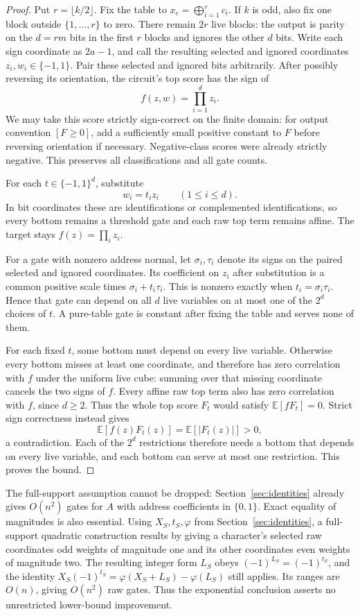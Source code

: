 \documentclass[11pt]{article}
\begin{document}
\begin{proof}
Put $r=\lfloor k/2\rfloor$. Fix the table to
$x_c=\bigoplus_{i=1}^r c_i$. If $k$ is odd, also fix one block outside
$\{1,\ldots,r\}$ to zero. There remain $2r$ live blocks: the output is
parity on the $d=rm$ bits in the first $r$ blocks and ignores the other
$d$ bits. Write each sign coordinate as $2a-1$, and call the resulting selected
and ignored coordinates $z_i,w_i\in\{-1,1\}$. Pair these selected
and ignored bits arbitrarily. After possibly reversing its orientation,
the circuit's top score has the sign of
$$
f(z,w)=\prod_{i=1}^d z_i.
$$
We may take this score strictly sign-correct on the finite domain: for
output convention $[F\ge0]$, add a sufficiently small positive constant
to $F$ before reversing orientation if necessary. Negative-class scores
were already strictly negative. This preserves all classifications and
all gate counts.

For each $t\in\{-1,1\}^d$, substitute
$$
w_i=t_i z_i\qquad(1\le i\le d).
$$
In bit coordinates these are identifications or complemented
identifications, so every bottom remains a threshold gate and each raw
top term remains affine. The target stays $f(z)=\prod_i z_i$.

For a gate with nonzero address normal, let $\sigma_i,\tau_i$ denote its
signs on the paired selected and ignored coordinates. Its coefficient
on $z_i$ after substitution is a common positive scale times
$\sigma_i+t_i\tau_i$. This is nonzero exactly when
$t_i=\sigma_i\tau_i$. Hence that gate can depend on all $d$ live variables
on at most one of the $2^d$ choices of $t$. A pure-table gate is constant
after fixing the table and serves none of them.

For each fixed $t$, some bottom must depend on every live variable.
Otherwise every bottom misses at least one coordinate, and therefore
has zero correlation with $f$ under the uniform live cube: summing over
that missing coordinate cancels the two signs of $f$. Every affine raw
top term also has zero correlation with $f$, since $d\ge2$. Thus the
whole top score $F_t$ would satisfy $\mathbb E[fF_t]=0$. Strict sign
correctness instead gives
$$
\mathbb E[f(z)F_t(z)]=\mathbb E[|F_t(z)|]>0,
$$
a contradiction. Each of the $2^d$ restrictions therefore needs a bottom
that depends on every live variable, and each bottom can serve at most
one restriction. This proves the bound.
\end{proof}


The full-support assumption cannot be dropped: Section~\ref{sec:identities}
already gives $O(n^2)$ gates for $A$ with address coefficients in $\{0,1\}$.
Exact equality of magnitudes is also essential. Using $X_S,t_S,\varphi$
from Section~\ref{sec:identities}, a full-support quadratic
construction results by giving a character's selected raw coordinates odd
weights of magnitude one and its other coordinates even weights of
magnitude two. The resulting integer form $L_S$ obeys
$(-1)^{L_S}=(-1)^{t_S}$, and the identity
$X_S(-1)^{t_S}=\varphi(X_S+L_S)-\varphi(L_S)$ still applies. Its ranges
are $O(n)$, giving $O(n^2)$ raw gates. Thus the exponential conclusion
asserts no unrestricted lower-bound improvement.
\end{document}
